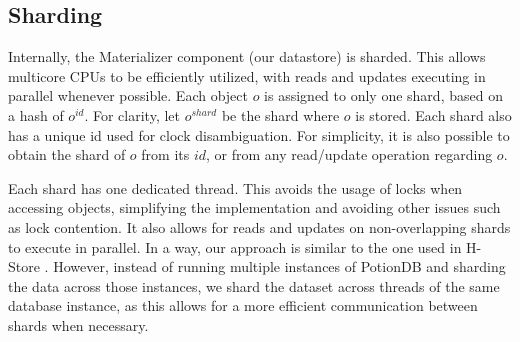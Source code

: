 \documentclass[sigconf, nonacm]{acmart}
\begin{document}

\subsection{Sharding}
\label{subsec:sharding}


Internally, the Materializer component (our datastore) is sharded.
This allows multicore CPUs to be efficiently utilized,
with reads and updates executing in parallel whenever possible.
Each object $o$ is assigned to only one shard, based on a hash of $o^{\mathit{id}}$.
For clarity, let $o^{\mathit{shard}}$ be the shard where $o$ is stored.
Each shard also has a unique id used for clock disambiguation.
For simplicity, it is also possible to obtain the shard of $o$ from its $id$, or from any read/update operation regarding $o$.

Each shard has one dedicated thread.
This avoids the usage of locks when accessing objects, simplifying the implementation and avoiding other issues such as lock contention.
It also allows for reads and updates on non-overlapping shards to execute in parallel.
In a way, our approach is similar to the one used in H-Store \cite{h-store}.
However, instead of running multiple instances of PotionDB and sharding the data across those instances, we shard the dataset across threads of the same database instance, as this allows for a more efficient communication between shards when necessary.

\end{document}
